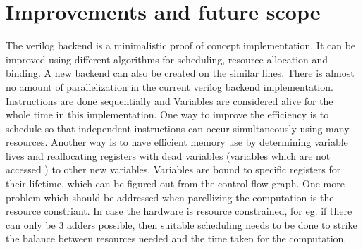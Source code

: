 \documentclass{article}
\begin{document}
    \section{Improvements and future scope}
        The verilog backend is a minimalistic proof of concept implementation. It can be improved using different algorithms for scheduling, resource allocation and binding. A new backend can also be created on the similar lines.
        There is almost no amount of parallelization in the current verilog backend implementation. Instructions are done sequentially and Variables are considered alive for the whole time in this implementation. One way to improve the efficiency is to schedule so that independent instructions can occur simultaneously using many resources. Another way is to have efficient memory use by determining variable lives and reallocating registers with dead variables (variables which are not accessed ) to other new variables. Variables are bound to specific registers for their lifetime, which can be figured out from the control flow graph. One more problem which should be addressed when parellizing the computation is the resource constriant. In case the hardware is resource constrained, for eg. if there can only be 3 adders possible, then suitable scheduling needs to be done to strike the balance between resources needed and the time taken for the computation.
\end{document}
